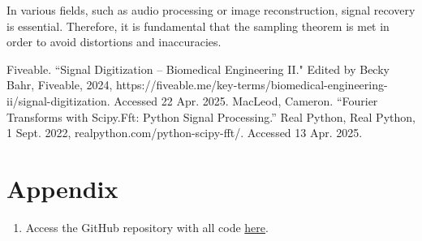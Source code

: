 \documentclass{article}
\begin{document}
In various fields, such as audio processing or image reconstruction, signal recovery is essential. 
Therefore, it is fundamental that the sampling theorem is met in order to avoid distortions and inaccuracies.

\begin{thebibliography}{9}
     Fiveable. ``Signal Digitization -- Biomedical Engineering II." Edited by Becky Bahr, Fiveable, 2024, https://fiveable.me/key-terms/biomedical-engineering-ii/signal-digitization. Accessed 22 Apr. 2025.
     MacLeod, Cameron. “Fourier Transforms with Scipy.Fft: Python Signal Processing.” Real Python, Real Python, 1 Sept. 2022, realpython.com/python-scipy-fft/. Accessed 13 Apr. 2025. 
\end{thebibliography}


\section{Appendix}
\begin{enumerate}
    \item Access the GitHub repository with all code \href{https://github.com/margheritatonon/approximation-II-assignment}{here}.
\end{enumerate}
\end{document}
